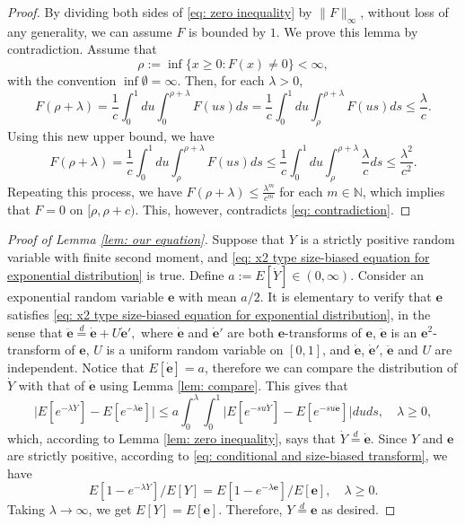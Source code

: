 \documentclass[12pt,a4paper]{amsart}
\numberwithin{equation}{section}
\begin{document}
\begin{proof}
	By dividing both sides of \eqref{eq: zero inequality} by $\|F\|_\infty$, without loss of any generality, we can assume $F$ is bounded by $1$.
    We prove this lemma by  contradiction.
	Assume that
\begin{equation}
\label{eq: contradiction}
	\rho
	:= \inf\{x \geq 0: F(x) \neq 0\}
	< \infty,
\end{equation}
with the convention $\inf \emptyset=\infty$.
	Then, for each $\lambda > 0$,
\[
	F(\rho + \lambda)
	= \frac{1}{c} \int_0^1 du \int_0^{\rho +\lambda} F(us) ds
	= \frac{1}{c} \int_0^1 du \int_\rho^{\rho+\lambda} F(us) ds \leq \frac{\lambda}{c}.
\]
	Using this new upper bound, we have
\[
	F(\rho + \lambda)
	= \frac{1}{c} \int_0^1 du \int_\rho^{\rho+\lambda} F(us) ds
	\leq \frac{1}{c} \int_0^1 du \int_\rho^{\rho+\lambda} \frac{\lambda}{c}ds
	\leq \frac{\lambda^2}{c^2}.
\]
	Repeating this process, we have $F(\rho + \lambda) \leq \frac{\lambda^m}{c^m}$ for each $m \in \mathbb N$, which implies that $F = 0$ on $[\rho, \rho + c)$.
	This, however, contradicts \eqref{eq: contradiction}.
\end{proof}

\begin{proof}[Proof of Lemma \ref{lem: our equation}]
	Suppose that $Y$ is a strictly positive random variable with finite second moment, and \eqref{eq: x2 type size-biased equation for exponential distribution} is true.
	Define
$
	a
	:= E[\dot Y] \in (0,\infty)
$.
 	Consider an exponential random variable $\mathbf e$ with mean $a/2$.
	It is elementary to verify that
	$\mathbf e$ satisfies
	\eqref{eq: x2 type size-biased equation for exponential distribution}, in the sense that
$
	\ddot {\mathbf e} \overset{d} = \dot {\mathbf e}+U\dot {\mathbf e}',
$
	where $\dot {\mathbf e}$ and $\dot {\mathbf e}'$ are
both $\mathbf e$-transforms of $\mathbf e$,
	$\ddot {\mathbf e}$ is an $\mathbf e^2$-transform of $\mathbf e$,
	$U$ is a uniform random variable on $[0,1]$, and $\dot {\mathbf e}$, $\dot {\mathbf e}'$,
	$\ddot {\mathbf e}$ and $U$ are independent.
	Notice that $E[\dot {\mathbf e}] = a$, therefore we can compare the distribution of $\dot Y$ 
	with that of $\dot {\mathbf e}$
	using Lemma \ref{lem: compare}.
	This gives that
\[
	\big|E[ e^{-\lambda \dot Y}] - E[ e^{-\lambda \dot {\mathbf e}}] \big|
	\leq  a  \int_0^\lambda \int_0^1 \big| E [e^{-s u \dot Y}] - E [e^{-s u \dot {\mathbf e}}] \big| du ds,
	\quad \lambda \geq 0,
\]
	which, according to Lemma \ref{lem: zero inequality}, says that
	$\dot Y \overset{d} = \dot {\mathbf e}$.
	Since $Y$ and $\mathbf e$ are strictly positive, according to \eqref{eq: conditional and size-biased transform}, we have
\[
	E[1-e^{-\lambda Y}]/ E[Y] = E[1-e^{-\lambda \mathbf e}]/ E[\mathbf e], \quad \lambda \geq 0.
\]
	Taking $\lambda \to \infty$, we get $E[Y] = E[\mathbf e]$. Therefore, $Y \overset{d} = \mathbf e$ as desired.
\end{proof}
\end{document}
